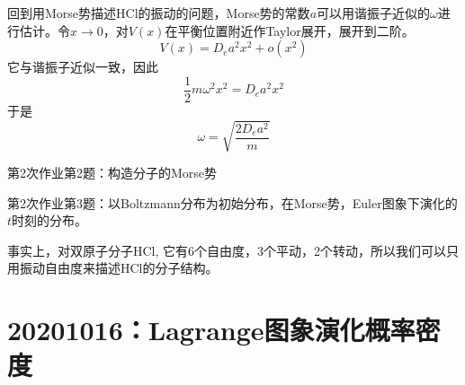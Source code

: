     回到用Morse势描述HCl的振动的问题，Morse势的常数$a$可以用谐振子近似的$\omega$进行估计。令$x \to 0 $，对$V(x)$在平衡位置附近作Taylor展开，展开到二阶。
    \begin{equation*}
        V(x) = D_e a^2 x^2 + o(x^2)
    \end{equation*}
    它与谐振子近似一致，因此
    \begin{equation*}
        \frac 12 m\omega^2x^2 = D_e a^2 x^2
    \end{equation*}
    于是
    \begin{equation*}
        \omega = \sqrt{\frac {2D_ea^2}m}
    \end{equation*}
    \begin{asg}
        第2次作业第2题：构造分子的Morse势
    \end{asg}
    \begin{asg}
        第2次作业第3题：以Boltzmann分布为初始分布，在Morse势，Euler图象下演化的$t$时刻的分布。
    \end{asg}
    事实上，对双原子分子HCl, 它有6个自由度，3个平动，2个转动，所以我们可以只用振动自由度来描述HCl的分子结构。

    \section{20201016：Lagrange图象演化概率密度}

